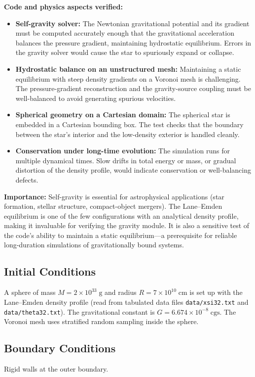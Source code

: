 \documentclass[11pt,a4paper]{article}
\begin{document}
\textbf{Code and physics aspects verified:}
\begin{itemize}
  \item \textbf{Self-gravity solver:} The Newtonian gravitational potential and its gradient must be computed accurately enough that the gravitational acceleration balances the pressure gradient, maintaining hydrostatic equilibrium. Errors in the gravity solver would cause the star to spuriously expand or collapse.
  \item \textbf{Hydrostatic balance on an unstructured mesh:} Maintaining a static equilibrium with steep density gradients on a Voronoi mesh is challenging. The pressure-gradient reconstruction and the gravity-source coupling must be well-balanced to avoid generating spurious velocities.
  \item \textbf{Spherical geometry on a Cartesian domain:} The spherical star is embedded in a Cartesian bounding box. The test checks that the boundary between the star's interior and the low-density exterior is handled cleanly.
  \item \textbf{Conservation under long-time evolution:} The simulation runs for multiple dynamical times. Slow drifts in total energy or mass, or gradual distortion of the density profile, would indicate conservation or well-balancing defects.
\end{itemize}

\textbf{Importance:} Self-gravity is essential for astrophysical applications (star formation, stellar structure, compact-object mergers). The Lane--Emden equilibrium is one of the few configurations with an analytical density profile, making it invaluable for verifying the gravity module. It is also a sensitive test of the code's ability to maintain a static equilibrium---a prerequisite for reliable long-duration simulations of gravitationally bound systems.

\subsection*{Initial Conditions}
A sphere of mass $M = 2\times10^{33}\;\mathrm{g}$ and radius $R = 7\times10^{10}\;\mathrm{cm}$ is set up with the Lane--Emden density profile (read from tabulated data files \texttt{data/xsi32.txt} and \texttt{data/theta32.txt}). The gravitational constant is $G = 6.674\times10^{-8}\;\mathrm{cgs}$. The Voronoi mesh uses stratified random sampling inside the sphere.

\subsection*{Boundary Conditions}
Rigid walls at the outer boundary.
\end{document}
